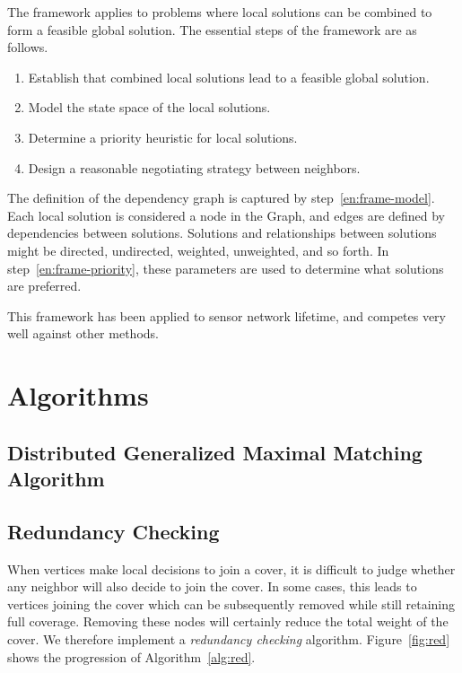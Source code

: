 The framework applies to problems where local solutions can be combined to form a feasible global solution. The essential steps of the framework are as follows. 
\begin{enumerate}
\item Establish that combined local solutions lead to a feasible global solution.
\item Model the state space of the local solutions. \label{en:frame-model}
\item Determine a priority heuristic for local solutions.\label{en:frame-priority}
\item Design a reasonable negotiating strategy between neighbors.
\end{enumerate} 

The definition of the dependency graph is captured by step~\ref{en:frame-model}. Each local solution is considered a node in the Graph, and edges are defined by dependencies between solutions. Solutions and relationships between solutions might be directed, undirected, weighted, unweighted, and so forth. In step~\ref{en:frame-priority}, these parameters are used to determine what solutions are preferred. 

This framework has been applied to sensor network lifetime, and competes very well against other methods\cite{Dhawan:hipc-09}.

\section{Algorithms}
\label{sec:algorithms}

\subsection{Distributed Generalized Maximal Matching Algorithm}

\subsection{Redundancy Checking}
\label{sec:redundant}
When vertices make local decisions to join a cover, it is difficult to judge whether any neighbor will also decide to join the cover. In some cases, this leads to vertices joining the cover which can be subsequently removed while still retaining full coverage. Removing these nodes will certainly reduce the total weight of the cover. We therefore implement a {\em redundancy checking} algorithm. Figure~\ref{fig:red} shows the progression of Algorithm~\ref{alg:red}.

